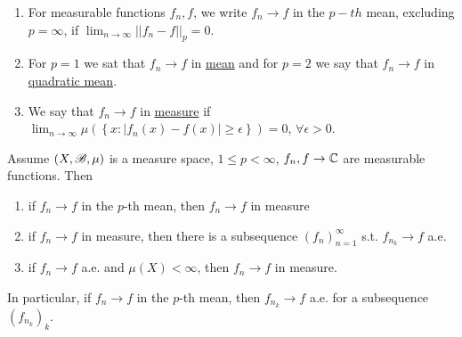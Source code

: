 \begin{enumerate}
    \item For measurable functions $f_n,f$, we write $f_n\rightarrow f$ in the $p-th$ mean, excluding $p=\infty$, if $\lim_{n\rightarrow\infty}||f_n-f||_p=0$.
    \item For $p=1$ we sat that $f_n\rightarrow f$ in \underline{mean} and for $p=2$ we say that $f_n\rightarrow f$ in \underline{quadratic mean}.
    \item We say that $f_n\rightarrow f$ in \underline{measure} if $\lim_{n\rightarrow\infty}\mu(\left\{x:|f_n(x)-f(x)|\geq \epsilon\right\})=0$, $\forall \epsilon>0$.
\end{enumerate}

\begin{theorem}
    Assume $(X,\mathscr{B},\mu)$ is a measure space, $1\leq p<\infty$, $f_n,f\rightarrow \mathbb{C}$ are measurable functions. Then
    \begin{enumerate}
        \item if $f_n\rightarrow f$ in the $p$-th mean, then $f_n\rightarrow f$ in measure 
        \item if $f_n\rightarrow f$ in measure, then there is a subsequence $(f_n)_{n=1}^\infty$ s.t. $f_{n_k}\rightarrow f$ a.e.
        \item if $f_n\rightarrow f$ a.e. and $\mu(X)<\infty$, then $f_n\rightarrow f$ in measure.
    \end{enumerate}
    In particular, if $f_n\rightarrow f$ in the $p$-th mean, then $f_{n_k}\rightarrow f$ a.e. for a subsequence $(f_{n_k})_k$.
\end{theorem}